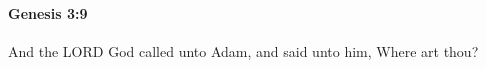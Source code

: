
		\paragraph{Genesis 3:9} %
			\label{GENESIS-3-9}

			And the LORD God called unto Adam, and said unto him, Where art thou?


